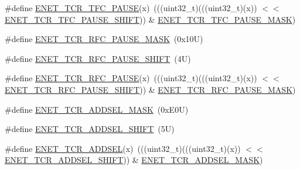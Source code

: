 \begin{DoxyCompactItemize}
\item 
\#define \mbox{\hyperlink{group___e_n_e_t___register___masks_ga5283b6d8027185729d69f2975e883a0f}{E\+N\+E\+T\+\_\+\+T\+C\+R\+\_\+\+T\+F\+C\+\_\+\+P\+A\+U\+SE}}(x)~(((uint32\+\_\+t)(((uint32\+\_\+t)(x)) $<$$<$ \mbox{\hyperlink{group___e_n_e_t___register___masks_ga100df2882bc10658b602c3b2f90c0ed3}{E\+N\+E\+T\+\_\+\+T\+C\+R\+\_\+\+T\+F\+C\+\_\+\+P\+A\+U\+S\+E\+\_\+\+S\+H\+I\+FT}})) \& \mbox{\hyperlink{group___e_n_e_t___register___masks_ga71a1167639f6bec0334adb16cdc8e049}{E\+N\+E\+T\+\_\+\+T\+C\+R\+\_\+\+T\+F\+C\+\_\+\+P\+A\+U\+S\+E\+\_\+\+M\+A\+SK}})
\item 
\#define \mbox{\hyperlink{group___e_n_e_t___register___masks_ga58df374de0ed871ab2ca078de9dbea40}{E\+N\+E\+T\+\_\+\+T\+C\+R\+\_\+\+R\+F\+C\+\_\+\+P\+A\+U\+S\+E\+\_\+\+M\+A\+SK}}~(0x10\+U)
\item 
\#define \mbox{\hyperlink{group___e_n_e_t___register___masks_ga78f8c9e05c33991ec790011804fee80d}{E\+N\+E\+T\+\_\+\+T\+C\+R\+\_\+\+R\+F\+C\+\_\+\+P\+A\+U\+S\+E\+\_\+\+S\+H\+I\+FT}}~(4\+U)
\item 
\#define \mbox{\hyperlink{group___e_n_e_t___register___masks_ga42de1074a93a9e74227e8e7c4b3e5a7c}{E\+N\+E\+T\+\_\+\+T\+C\+R\+\_\+\+R\+F\+C\+\_\+\+P\+A\+U\+SE}}(x)~(((uint32\+\_\+t)(((uint32\+\_\+t)(x)) $<$$<$ \mbox{\hyperlink{group___e_n_e_t___register___masks_ga78f8c9e05c33991ec790011804fee80d}{E\+N\+E\+T\+\_\+\+T\+C\+R\+\_\+\+R\+F\+C\+\_\+\+P\+A\+U\+S\+E\+\_\+\+S\+H\+I\+FT}})) \& \mbox{\hyperlink{group___e_n_e_t___register___masks_ga58df374de0ed871ab2ca078de9dbea40}{E\+N\+E\+T\+\_\+\+T\+C\+R\+\_\+\+R\+F\+C\+\_\+\+P\+A\+U\+S\+E\+\_\+\+M\+A\+SK}})
\item 
\#define \mbox{\hyperlink{group___e_n_e_t___register___masks_ga3bfa977a883b14b1f86c879e0a31ef5b}{E\+N\+E\+T\+\_\+\+T\+C\+R\+\_\+\+A\+D\+D\+S\+E\+L\+\_\+\+M\+A\+SK}}~(0x\+E0\+U)
\item 
\#define \mbox{\hyperlink{group___e_n_e_t___register___masks_ga1916110879ce7cd7c03a5aa919a26914}{E\+N\+E\+T\+\_\+\+T\+C\+R\+\_\+\+A\+D\+D\+S\+E\+L\+\_\+\+S\+H\+I\+FT}}~(5\+U)
\item 
\#define \mbox{\hyperlink{group___e_n_e_t___register___masks_ga6e0eea8e7474ee69a76c7d909b7e8217}{E\+N\+E\+T\+\_\+\+T\+C\+R\+\_\+\+A\+D\+D\+S\+EL}}(x)~(((uint32\+\_\+t)(((uint32\+\_\+t)(x)) $<$$<$ \mbox{\hyperlink{group___e_n_e_t___register___masks_ga1916110879ce7cd7c03a5aa919a26914}{E\+N\+E\+T\+\_\+\+T\+C\+R\+\_\+\+A\+D\+D\+S\+E\+L\+\_\+\+S\+H\+I\+FT}})) \& \mbox{\hyperlink{group___e_n_e_t___register___masks_ga3bfa977a883b14b1f86c879e0a31ef5b}{E\+N\+E\+T\+\_\+\+T\+C\+R\+\_\+\+A\+D\+D\+S\+E\+L\+\_\+\+M\+A\+SK}})
$$
\end{DoxyCompactItemize}
